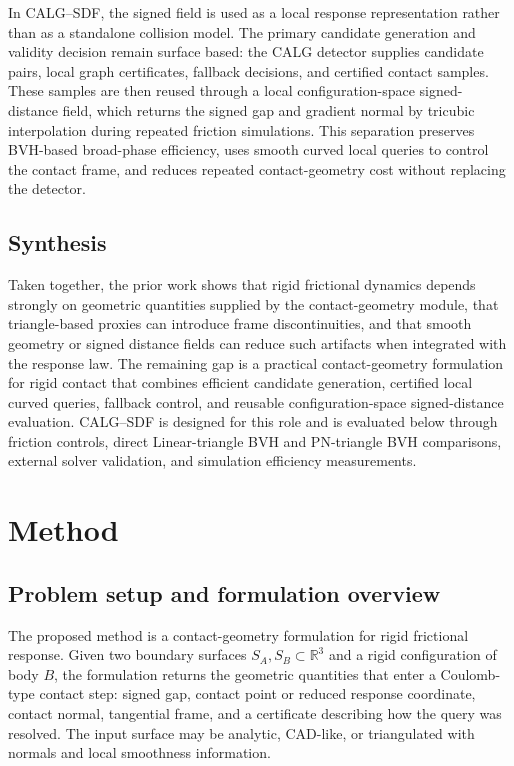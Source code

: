 \documentclass[preprint,12pt]{elsarticle}
\newcommand{\R}{\mathbb{R}}
\newcommand{\calg}{\textsc{CALG}}
\begin{document}
In \calg{}--SDF, the signed field is used as a local response representation rather than as a standalone collision model. The primary candidate generation and validity decision remain surface based: the CALG detector supplies candidate pairs, local graph certificates, fallback decisions, and certified contact samples. These samples are then reused through a local configuration-space signed-distance field, which returns the signed gap and gradient normal by tricubic interpolation during repeated friction simulations. This separation preserves BVH-based broad-phase efficiency, uses smooth curved local queries to control the contact frame, and reduces repeated contact-geometry cost without replacing the detector.

\subsection{Synthesis}

Taken together, the prior work shows that rigid frictional dynamics depends strongly on geometric quantities supplied by the contact-geometry module, that triangle-based proxies can introduce frame discontinuities, and that smooth geometry or signed distance fields can reduce such artifacts when integrated with the response law. The remaining gap is a practical contact-geometry formulation for rigid contact that combines efficient candidate generation, certified local curved queries, fallback control, and reusable configuration-space signed-distance evaluation. \calg{}--SDF is designed for this role and is evaluated below through friction controls, direct Linear-triangle BVH and PN-triangle BVH comparisons, external solver validation, and simulation efficiency measurements.

\section{Method}
\label{sec:method}

\subsection{Problem setup and formulation overview}

The proposed method is a contact-geometry formulation for rigid frictional response. Given two boundary surfaces $S_A,S_B\subset\R^3$ and a rigid configuration of body $B$, the formulation returns the geometric quantities that enter a Coulomb-type contact step: signed gap, contact point or reduced response coordinate, contact normal, tangential frame, and a certificate describing how the query was resolved. The input surface may be analytic, CAD-like, or triangulated with normals and local smoothness information.
\end{document}
